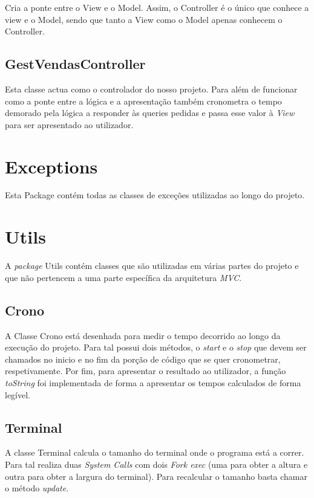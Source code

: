 \documentclass[a4paper]{report}
\begin{document}
Cria a ponte entre o View e o Model. Assim, o Controller é o único que conhece a view e o
Model, sendo que tanto a View como o Model apenas conhecem o Controller.

\subsection{GestVendasController}

Esta classe actua como o controlador do nosso projeto. Para além de funcionar como a ponte entre
a lógica e a apresentação também cronometra o tempo demorado pela lógica a responder às queries pedidas
e passa esse valor à \textit{View} para ser apresentado ao utilizador.

\section{Exceptions}

Esta Package contém todas as classes de exceções utilizadas ao longo do projeto.

\section{Utils}

A \textit{package} Utils contém classes que são utilizadas em várias partes do projeto e que não
pertencem a uma parte específica da arquitetura \textit{MVC}.

\subsection{Crono}

A Classe Crono está desenhada para medir o tempo decorrido ao longo da execução do projeto.
Para tal possui dois métodos, o \textit{start} e o \textit{stop} que devem ser chamados no
inicio e no fim da porção de código que se quer cronometrar, respetivamente.
Por fim, para apresentar o resultado ao utilizador, a função \textit{toString} foi implementada
de forma a apresentar os tempos calculados de forma legível.

\subsection{Terminal}

A classe Terminal calcula o tamanho do terminal onde o programa está a correr.
Para tal realiza duas \textit{System Calls} com dois \textit{Fork exec} (uma para obter a altura
e outra para obter a largura do terminal).
Para recalcular o tamanho basta chamar o método \textit{update}.
\end{document}
